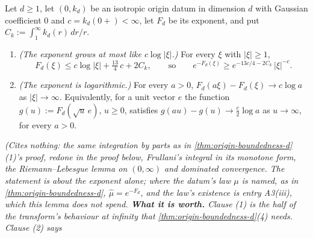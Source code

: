 \begin{lemma}
\label{lem:isotropic-exponent-log}
\leanok
Let $d \ge 1$, let $(0,k_d)$ be an isotropic origin datum in dimension $d$ with Gaussian
coefficient $0$ and $c = k_d(0{+}) < \infty$, let $F_d$ be its exponent, and put
$C_k := \int_1^\infty k_d(r)\,dr/r$.
\begin{enumerate}
\item \emph{(The exponent grows at most like $c\log|\xi|$.)} For every $\xi$ with $|\xi| \ge 1$,
\[
  F_d(\xi) \le c\log|\xi| + \tfrac{13}{4}\,c + 2C_k ,
  \qquad\text{so}\qquad
  e^{-F_d(\xi)} \ge e^{-13c/4 - 2C_k}\,|\xi|^{-c} .
\]
\item \emph{(The exponent is logarithmic.)} For every $a > 0$,
$F_d(a\xi) - F_d(\xi) \to c\log a$ as $|\xi| \to \infty$. Equivalently, for a unit vector $e$ the
function $g(u) := F_d(\sqrt u\,e)$, $u \ge 0$, satisfies $g(au) - g(u) \to \tfrac c2\log a$ as
$u \to \infty$, for every $a > 0$.
\end{enumerate}
\statusT\quad\emph{(Cites nothing: the same integration by parts as in
\ref{thm:origin-boundedness-d}(1)'s proof, redone in the proof below, Frullani's integral in its monotone form, the Riemann--Lebesgue lemma on $(0,\infty)$ and
dominated convergence. The statement is about the exponent alone; where the datum's law $\mu$
is named, as in \ref{thm:origin-boundedness-d}, $\widehat\mu = e^{-F_d}$, and the law's existence is
entry A3(iii), which this lemma does not spend. \textbf{What it is worth.} Clause (1) is the half of
the transform's behaviour at infinity that \ref{thm:origin-boundedness-d}(4) needs. Clause (2) says
}
\end{lemma}
